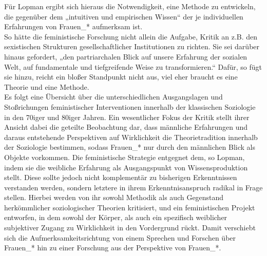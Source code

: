 Für Lopman ergibt sich hieraus die Notwendigkeit, eine Methode zu entwickeln,
die gegenüber dem „intuitiven und empirischen Wissen“\footnotemark
{} der je individuellen
Erfahrungen von Frauen\_* aufmerksam ist.\\
 So hätte die feministische Forschung
nicht allein die Aufgabe, Kritik an z.B. den sexistischen Strukturen
gesellschaftlicher Institutionen zu richten. Sie sei darüber hinaus gefordert,
„den partriarchalen Blick auf unsere Erfahrung der sozialen Welt, auf
fundamentale und tiefgreifende Weise zu transformieren.“ Dafür, so fügt sie
hinzu, reicht ein bloßer Standpunkt nicht aus, viel eher braucht es eine
Theorie und eine Methode.\footnotemark{}\\
 Es folgt eine Übersicht über die unterschiedlichen
Ausgangslagen und Stoßrichungen feministischer Interventionen innerhalb der
klassischen Soziologie in den 70iger und 80iger Jahren. Ein wesentlicher Fokus
der Kritik stellt ihrer Ansicht dabei die geteilte Beobachtung dar, dass
männliche Erfahrungen und daraus entstehende Perspektiven auf Wirklichkeit die
Theorietradition innerhalb der Soziologie bestimmen, sodass Frauen\_* nur durch
den männlichen Blick als Objekte vorkommen. Die feministische Strategie
entgegnet dem, so Lopman, indem sie die weibliche Erfahrung als Ausgangspunkt
von Wissensproduktion stellt. Diese sollte jedoch nicht komplementär zu
bisherigen Erkenntnissen verstanden werden, sondern letztere in ihrem
Erkenntnisanspruch radikal in Frage stellen. Hierbei werden von ihr sowohl
Methodik als auch Gegenstand herkömmlicher soziologischer Theorien kritisiert,
und ein feministischen Projekt entworfen, in dem sowohl der Körper, als auch
ein spezifisch weiblicher subjektiver Zugang zu Wirklichkeit in den Vordergrund
rückt. Damit verschiebt sich die Aufmerksamkeitsrichtung von einem Sprechen und
Forschen über Frauen\_* hin zu einer Forschung aus der Perspektive von
Frauen\_*.\footnotemark {}\\

